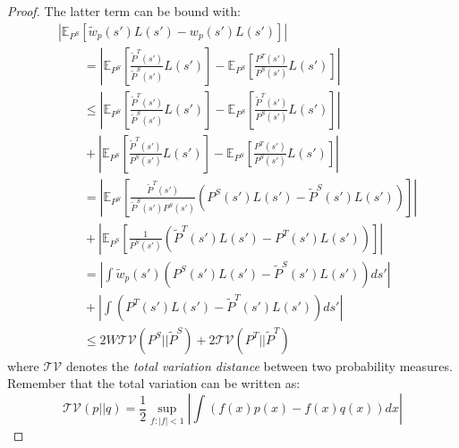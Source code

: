 \begin{proof}
        The latter term can be bound with:
        \begin{equation}
          \begin{aligned}
            & |\mathbb{E}_{P^S}[\tilde{w}_{p}(s')L(s') - w_{p}(s')L(s')]| \\
            & \qquad =    \left | \mathbb{E}_{P^{S}} \left [ \frac{\tilde{P}^{T}(s')}{\tilde{P}^{S}(s')}L(s') \right ] - \mathbb{E}_{P^{S}} \left [ \frac{P^{T}(s')}{P^{S}(s')}L(s') \right ] \right | \\
            & \qquad \leq \left | \mathbb{E}_{P^{S}} \left [ \frac{\tilde{P}^{T}(s')}{\tilde{P}^{S}(s')}L(s') \right ] - \mathbb{E}_{P^{S}} \left [ \frac{\tilde{P}^{T}(s')}{P^{S}(s')}L(s') \right ] \right | \\
            & \qquad + \left | \mathbb{E}_{P^{S}} \left [ \frac{\tilde{P}^{T}(s')}{P^{S}(s')}L(s') \right ] - \mathbb{E}_{P^{S}} \left [ \frac{P^{T}(s')}{P^{S}(s')}L(s') \right ] \right | \\
            & \qquad = \left | \mathbb{E}_{P^{S}} \left [ \frac{\tilde{P}^{T}(s')}{\tilde{P}^{S}(s')P^{S}(s')} \left ( P^{S}(s')L(s') - \tilde{P}^{S}(s')L(s') \right ) \right ] \right | \\
            & \qquad + \left | \mathbb{E}_{P^S} \left [ \frac{1}{P^{S}(s')} \left ( \tilde{P}^{T}(s')L(s') - P^{T}(s')L(s') \right ) \right ] \right | \\
            & \qquad = \left | \int \tilde{w}_{p}(s') \left ( P^{S} (s') L(s') - \tilde{P}^{S}(s')L(s')\right ) ds' \right | \\
            & \qquad + \left | \int \left ( P^{T}(s')L(s') - \tilde{P}^{T}(s')L(s') \right ) ds' \right | \\
            & \qquad \leq 2W\mathcal{TV}(P^{S}||\tilde{P}^{S}) + 2\mathcal{TV}(P^{T}||\tilde{P}^{T})
          \end{aligned}
        \end{equation}
        where $\mathcal{TV}$ denotes the \textit{total variation distance} between two probability measures. Remember that the
        total variation can be written as:
        \begin{equation}
          \mathcal{TV}(p||q) = \frac{1}{2} \sup_{f:|f|<1} \left | \int (f(x)p(x) - f(x)q(x)) dx \right |
        \end{equation}


\end{proof}
